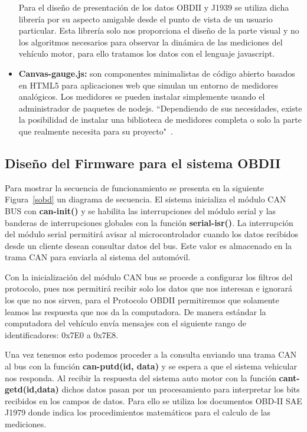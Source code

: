 \begin{itemize}
	Para el diseño de presentación de los datos OBDII y J1939 se utiliza dicha librería por su aspecto amigable desde el punto de vista de un usuario particular. 
	Esta librería solo nos proporciona el diseño de la parte visual y no los algoritmos necesarios para observar la dinámica de las mediciones del vehículo motor, para ello tratamos los datos con el lenguaje javascript. 
	
	\item {\bfseries Canvas-gauge.js:} son componentes minimalistas de código abierto basados en HTML5 para aplicaciones web que simulan un entorno de medidores analógicos. 
	Los medidores  se pueden instalar simplemente usando el administrador de paquetes de nodejs. ``Dependiendo de sus necesidades, existe la posibilidad de instalar una biblioteca de medidores completa o solo la parte que realmente necesita para su proyecto"~\cite{gauge}. %
	
\end{itemize}


\subsection{Diseño del Firmware para el sistema OBDII}

Para mostrar la secuencia de funcionamiento se presenta en la siguiente  Figura~\ref{sobd} un diagrama de secuencia. 
El sistema inicializa el módulo CAN BUS con {\bfseries can-init()} y se habilita las interrupciones del módulo serial y las banderas de interrupciones globales con la función {\bfseries serial-isr()}. 
La interrupción del módulo serial permitirá avisar al microcontrolador cuando los datos recibidos desde un cliente desean consultar datos del bus. 
Este valor es almacenado en la trama CAN para enviarla al sistema del automóvil.

Con la inicialización del módulo CAN bus se procede a configurar los filtros del protocolo, pues nos permitirá recibir solo los datos que nos interesan e ignorará los que no nos sirven, para el Protocolo OBDII permitiremos que solamente leamos las respuesta que nos da la computadora. 
De manera estándar la computadora del vehículo envía mensajes con el siguiente rango de identificadores: 0x7E0 a 0x7E8. 

Una vez tenemos esto podemos proceder a la consulta enviando una trama CAN al bus con la función {\bfseries can-putd(id, data)} y se espera a que el sistema vehicular nos responda. 
Al recibir la respuesta del sistema auto motor con la función {\bfseries cant-getd(id,data)} dichos datos pasan por un procesamiento para interpretar los bits recibidos en los campos de datos. 
Para ello se utiliza los documentos OBD-II SAE J1979 donde indica los procedimientos matemáticos para el calculo de las mediciones. 

